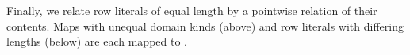 \documentclass[sigplan,screen]{acmart}
\begin{document}
Finally, we relate row literals of equal length by a pointwise relation of their contents. Maps with unequal domain kinds (above) and row literals with differing lengths (below) are each mapped to .

\begin{AgdaAlign}
\begin{code}%
%
\>[2]\AgdaSpace{}%
\AgdaSymbol{\{}\AgdaSpace{}%
\AgdaSymbol{=}\AgdaSpace{}%
\AgdaOperator{\AgdaInductiveConstructor{R[}}\AgdaSpace{}%
\AgdaSpace{}%
\AgdaOperator{\AgdaInductiveConstructor{]}}\AgdaSymbol{\}}\AgdaSpace{}%
\AgdaSymbol{(}\AgdaSpace{}%
\AgdaSymbol{(}\AgdaSpace{}%
\AgdaOperator{\AgdaInductiveConstructor{,}}\AgdaSpace{}%
\AgdaSymbol{)}\AgdaSpace{}%
\AgdaSymbol{)}\AgdaSpace{}%
\AgdaSymbol{(}\AgdaSpace{}%
\AgdaSymbol{(}\AgdaSpace{}%
\AgdaOperator{\AgdaInductiveConstructor{,}}\AgdaSpace{}%
\AgdaSymbol{)}\AgdaSpace{}%
\AgdaSymbol{)}\AgdaSpace{}%
\<%
\\
\>[2][@{}l@{\AgdaIndent{0}}]%
\>[4]\AgdaSpace{}%
\AgdaSpace{}%
\<%
\\
%
\>[2]\AgdaSpace{}%
\AgdaSymbol{|}\AgdaSpace{}%
\AgdaSpace{}%
\AgdaSpace{}%
\AgdaSymbol{=}\AgdaSpace{}%
\AgdaSymbol{(}\AgdaSpace{}%
\AgdaSymbol{:}\AgdaSpace{}%
\AgdaSpace{}%
\AgdaSymbol{)}\AgdaSpace{}%
%
\>[34]\AgdaSpace{}%
\AgdaSpace{}%
\AgdaSpace{}%
\AgdaSpace{}%
\<%
\\
\>[2][@{}l@{\AgdaIndent{0}}]%
\>[4]\<%
\\
\>[4][@{}l@{\AgdaIndent{0}}]%
\>[6]\AgdaSpace{}%
\AgdaSymbol{:}\AgdaSpace{}%
\AgdaSpace{}%
\AgdaSymbol{\{}\AgdaSymbol{\}}\AgdaSpace{}%
\AgdaSpace{}%
\AgdaSymbol{(}\AgdaSpace{}%
\AgdaSpace{}%
\AgdaSymbol{:}\AgdaSpace{}%
\AgdaSpace{}%
\AgdaSpace{}%
\AgdaSpace{}%
\AgdaSpace{}%
\AgdaSymbol{)}\AgdaSpace{}%
\AgdaSpace{}%
\<%

\end{code}
\end{AgdaAlign}
\end{document}

